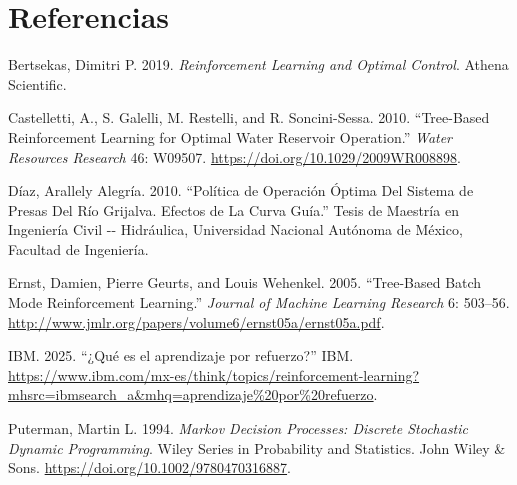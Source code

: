 \documentclass[
  letterpaper,
  DIV=11,
  numbers=noendperiod]{scrreprt}
\newlength{\cslhangindent}
\newenvironment{CSLReferences}[2] %
 {\begin{list}{}{%
  \setlength{\itemindent}{0pt}
  \setlength{\leftmargin}{0pt}
  \setlength{\parsep}{0pt}
  \ifodd #1
   \setlength{\leftmargin}{\cslhangindent}
   \setlength{\itemindent}{-1\cslhangindent}
  \fi
  \setlength{\itemsep}{#2\baselineskip}}}
 {\end{list}}
\theoremstyle{definition}
\theoremstyle{remark}
\begin{document}

\chapter{}\label{section-1}


\chapter*{Referencias}\label{referencias}


\protect{}\label{refs}
\begin{CSLReferences}{1}{1}
Bertsekas, Dimitri P. 2019. \emph{Reinforcement Learning and Optimal
Control}. Athena Scientific.

Castelletti, A., S. Galelli, M. Restelli, and R. Soncini-Sessa. 2010.
{``Tree-Based Reinforcement Learning for Optimal Water Reservoir
Operation.''} \emph{Water Resources Research} 46: W09507.
\url{https://doi.org/10.1029/2009WR008898}.

Díaz, Arallely Alegría. 2010. {``Política de Operación Óptima Del
Sistema de Presas Del Río Grijalva. Efectos de La Curva Guía.''} Tesis
de Maestría en Ingeniería Civil -\/- Hidráulica, Universidad Nacional
Autónoma de México, Facultad de Ingeniería.

Ernst, Damien, Pierre Geurts, and Louis Wehenkel. 2005. {``Tree-Based
Batch Mode Reinforcement Learning.''} \emph{Journal of Machine Learning
Research} 6: 503--56.
\url{http://www.jmlr.org/papers/volume6/ernst05a/ernst05a.pdf}.

IBM. 2025. {``¿Qué es el aprendizaje por refuerzo?''} IBM.
\url{https://www.ibm.com/mx-es/think/topics/reinforcement-learning?mhsrc=ibmsearch_a&mhq=aprendizaje\%20por\%20refuerzo}.

Puterman, Martin L. 1994. \emph{Markov Decision Processes: Discrete
Stochastic Dynamic Programming}. Wiley Series in Probability and
Statistics. John Wiley \& Sons.
\url{https://doi.org/10.1002/9780470316887}.

\end{CSLReferences}
\end{document}
